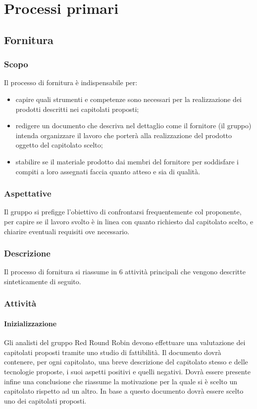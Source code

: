 \section{Processi primari} 


\subsection{Fornitura}

	\subsubsection{Scopo}
	Il processo di fornitura è indispensabile per:
	\begin{itemize}
	\item capire quali strumenti e competenze sono necessari per la realizzazione dei prodotti descritti nei capitolati proposti;
	\item redigere un documento che descriva nel dettaglio come il fornitore (il gruppo) intenda organizzare il lavoro che porterà alla realizzazione del prodotto oggetto del capitolato scelto;
	\item stabilire se il materiale prodotto dai membri del fornitore per soddisfare i compiti a loro assegnati faccia quanto atteso e sia di qualità.    
	\end{itemize}
 	\subsubsection{Aspettative}
	Il gruppo si prefigge l'obiettivo di confrontarsi frequentemente col proponente, per capire se il lavoro svolto è in linea con quanto richiesto dal capitolato scelto, e chiarire eventuali requisiti ove necessario.
	\subsubsection{Descrizione}
	Il processo di fornitura si riassume in 6 attività principali che vengono descritte sinteticamente di seguito. 
	\subsubsection{Attività}
		
		\paragraph{Inizializzazione}
			Gli analisti del gruppo Red Round Robin devono effettuare una valutazione dei capitolati proposti tramite uno studio di fattibilità. 
			 Il documento dovrà contenere, per ogni capitolato, una breve descrizione del capitolato stesso e delle tecnologie proposte, i suoi aspetti positivi e quelli negativi. Dovrà essere presente infine una conclusione che riassume la motivazione per la quale si è scelto un capitolato rispetto ad un altro. 
			In base a questo documento dovrà essere scelto uno dei capitolati proposti.
